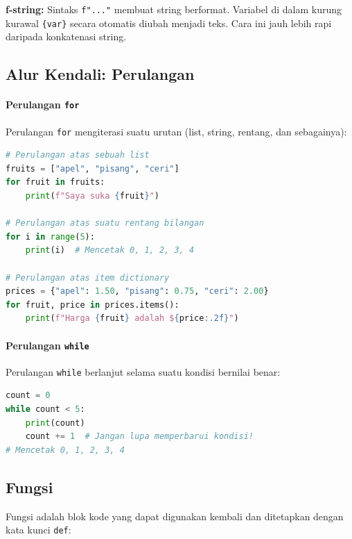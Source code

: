 \begin{info}
\textbf{f-string:} Sintaks \texttt{f"..."} membuat string berformat. Variabel di dalam kurung kurawal \texttt{\{var\}} secara otomatis diubah menjadi teks. Cara ini jauh lebih rapi daripada konkatenasi string.
\end{info}

\subsection{Alur Kendali: Perulangan}

\paragraph{Perulangan \texttt{for}}

Perulangan \texttt{for} mengiterasi suatu urutan (list, string, rentang, dan sebagainya):

\begin{lstlisting}[language=Python]
# Perulangan atas sebuah list
fruits = ["apel", "pisang", "ceri"]
for fruit in fruits:
    print(f"Saya suka {fruit}")

# Perulangan atas suatu rentang bilangan
for i in range(5):
    print(i)  # Mencetak 0, 1, 2, 3, 4

# Perulangan atas item dictionary
prices = {"apel": 1.50, "pisang": 0.75, "ceri": 2.00}
for fruit, price in prices.items():
    print(f"Harga {fruit} adalah ${price:.2f}")
\end{lstlisting}

\paragraph{Perulangan \texttt{while}}

Perulangan \texttt{while} berlanjut selama suatu kondisi bernilai benar:

\begin{lstlisting}[language=Python]
count = 0
while count < 5:
    print(count)
    count += 1  # Jangan lupa memperbarui kondisi!
# Mencetak 0, 1, 2, 3, 4
\end{lstlisting}

\subsection{Fungsi}

Fungsi adalah blok kode yang dapat digunakan kembali dan ditetapkan dengan kata kunci \texttt{def}:

